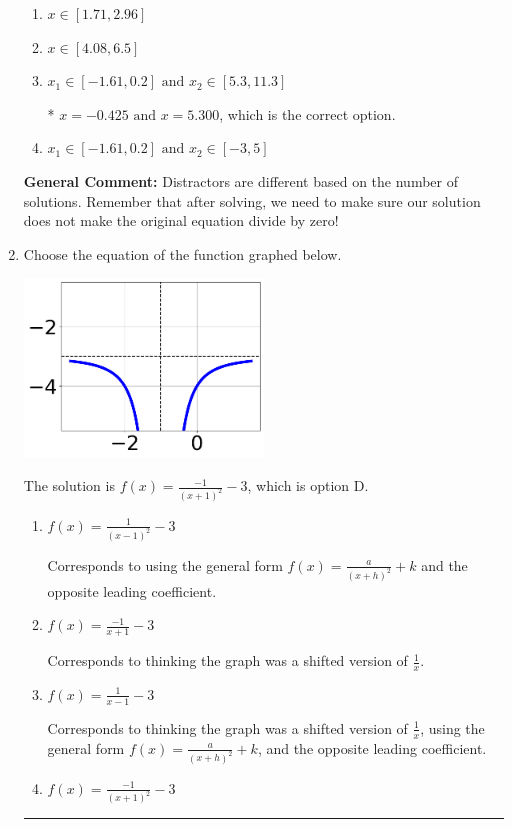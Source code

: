 \documentclass{extbook}[14pt]
\newcommand{\litem}[1]{\item #1

\rule{\textwidth}{0.4pt}}
\begin{document}
\begin{enumerate}
{\begin{enumerate}[label=\Alph*.]
\item \( x \in [1.71,2.96] \)


\item \( x \in [4.08,6.5] \)


\item \( x_1 \in [-1.61, 0.2] \text{ and } x_2 \in [5.3,11.3] \)

* $x = -0.425 \text{ and } x = 5.300$, which is the correct option.
\item \( x_1 \in [-1.61, 0.2] \text{ and } x_2 \in [-3,5] \)


\end{enumerate}

\textbf{General Comment:} Distractors are different based on the number of solutions. Remember that after solving, we need to make sure our solution does not make the original equation divide by zero!
}
\litem{
Choose the equation of the function graphed below.

\begin{center}
    \includegraphics[width=0.5\textwidth]{../Figures/rationalGraphToEquationB.png}
\end{center}


The solution is \( f(x) = \frac{-1}{(x + 1)^2} - 3 \), which is option D.\begin{enumerate}[label=\Alph*.]
\item \( f(x) = \frac{1}{(x - 1)^2} - 3 \)

Corresponds to using the general form $f(x) = \frac{a}{(x+h)^2}+k$ and the opposite leading coefficient.
\item \( f(x) = \frac{-1}{x + 1} - 3 \)

Corresponds to thinking the graph was a shifted version of $\frac{1}{x}$.
\item \( f(x) = \frac{1}{x - 1} - 3 \)

Corresponds to thinking the graph was a shifted version of $\frac{1}{x}$, using the general form $f(x) = \frac{a}{(x+h)^2}+k$, and the opposite leading coefficient.
\item \( f(x) = \frac{-1}{(x + 1)^2} - 3 \)


\end{enumerate}}
\end{enumerate}
\end{document}
